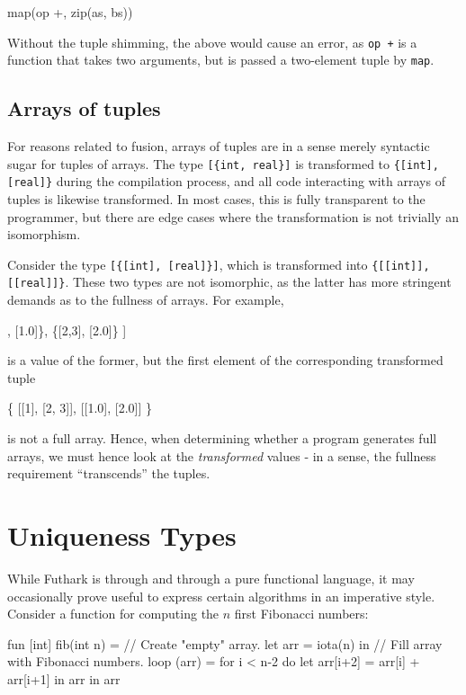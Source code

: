 \documentclass[oneside]{memoir}
\begin{document}
\begin{colorcode}
  map(op +, zip(as, bs))
\end{colorcode}

Without the tuple shimming, the above would cause an error, as
\texttt{op +} is a function that takes two arguments, but is passed a
two-element tuple by \texttt{map}.

\subsection{Arrays of tuples}

For reasons related to fusion, arrays of tuples are in a sense merely
syntactic sugar for tuples of arrays.  The type \texttt{[\{int,
  real\}]} is transformed to \texttt{\{[int], [real]\}} during the
compilation process, and all code interacting with arrays of tuples is
likewise transformed.  In most cases, this is fully transparent to the
programmer, but there are edge cases where the transformation is not
trivially an isomorphism.

Consider the type \texttt{[\{[int], [real]\}]}, which is transformed
into \texttt{\{[[int]], [[real]]\}}.  These two types are not
isomorphic, as the latter has more stringent demands as to the
fullness of arrays.  For example,
\begin{colorcode}
[
 \{[1],   [1.0]\},
 \{[2,3], [2.0]\}
]
\end{colorcode}
is a value of the former, but the first element of the
corresponding transformed tuple
\begin{colorcode}
\{
 [[1],   [2, 3]],
 [[1.0], [2.0]]
\}
\end{colorcode}
is not a full array.  Hence, when determining whether a program
generates full arrays, we must hence look at the \textit{transformed}
values - in a sense, the fullness requirement ``transcends'' the
tuples.

\section{Uniqueness Types}
\label{sec:futhark-uniqueness-types}

While Futhark is through and through a pure functional language, it may
occasionally prove useful to express certain algorithms in an
imperative style.  Consider a function for computing the $n$ first
Fibonacci numbers:

\begin{colorcode}
fun [int] fib(int n) =
  // Create "empty" array.
  let arr = iota(n) in
  // Fill array with Fibonacci numbers.
  loop (arr) = for i < n-2 do
                 let arr[i+2] = arr[i] + arr[i+1]
                 in arr
  in arr
\end{colorcode}
\end{document}
